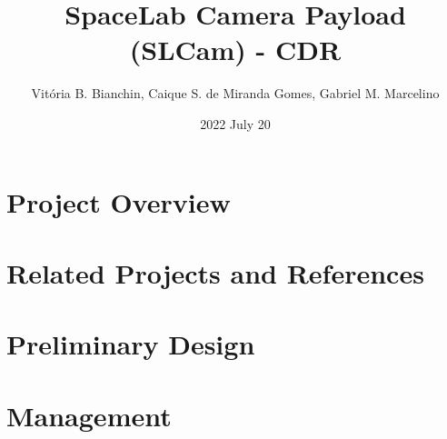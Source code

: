 \documentclass{beamer}
\title[Presentation]{SpaceLab Camera Payload (SLCam) - CDR}
\author[SpaceLab]{Vitória B. Bianchin, Caique S. de Miranda Gomes, Gabriel M. Marcelino}
\institute[]{SpaceLab - UFSC}
\date{2022 July 20}
\begin{document}
    
    

    \section{Project Overview}

        

    \section{Related Projects and References}

        

    \section{Preliminary Design}

        

    \section{Management}

        

\end{document}
